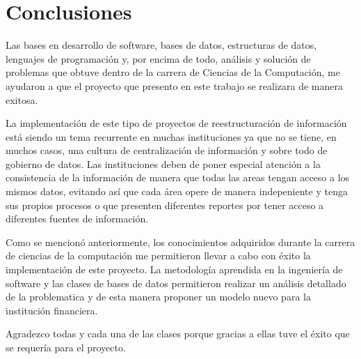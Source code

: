 \chapter{Conclusiones}
\label{cap:conclusiones}

Las bases en desarrollo de software, bases de datos, estructuras de datos,
lenguajes de programación y, por encima de todo, análisis y solución de
problemas que obtuve dentro de la carrera de Ciencias de la Computación, me
ayudaron a que el proyecto que presento en este trabajo se realizara de manera
exitosa.

La implementación de este tipo de proyectos de reestructuración de información 
está siendo un tema recurrente en muchas instituciones ya que no se tiene, en muchos casos, 
una cultura de centralización de información y sobre todo de gobierno de datos. 
Las instituciones deben de poner especial atención a la consistencia de la información de 
manera que todas las areas tengan acceso a los mismos datos, evitando así que cada área 
opere de manera indepeniente y tenga sus propios procesos o que presenten diferentes reportes
por tener acceso a diferentes fuentes de información.

Como se mencionó anteriormente, los conocimientos adquiridos durante la carrera de ciencias de 
la computación me permitieron llevar a cabo con éxito la implementación de este proyecto. La 
metodología aprendida en la ingeniería de software y las clases de bases de datos permitieron realizar 
un análisis detallado de la problematica y de esta manera proponer un modelo nuevo para la institución
financiera. 

Agradezco todas y cada una de las clases porque gracias a ellas tuve el éxito que se requería para 
el proyecto. 

\cleardoublepage

